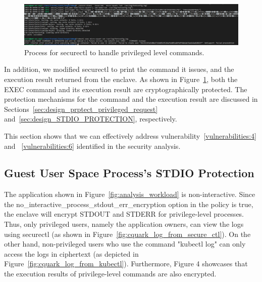 \begin{figure}[!htb]
    \centering
    \includegraphics[width=1\textwidth]{images/cquark_priviled_cmd_result_protection.PNG}
    \caption[Process for securectl to handle privileged level commands]{Process for securectl to handle privileged level commands.}
    \label{fig:cquark_priviled_cmd_result_protection}
\end{figure}


In addition, we modified securectl to print the command it issues, and the execution result returned from the enclave. As shown in Figure~\ref{fig:cquark_priviled_cmd_result_protection}, both the EXEC command and its execution result are cryptographically protected. The protection mechanisms for the command and the execution result are 
discussed in Sections~\ref{sec:design_prptect_privileged_request} and~\ref{sec:design_STDIO_PROTECTION}, respectively.


This section shows that we can effectively address vulnerability~\ref{vulnerabilities:4} and ~\ref{vulnerabilities:6} identified in the security analysis.



\subsection{Guest User Space Process's STDIO Protection}
The application shown in Figure~\ref{fig:analysis_workload} is non-interactive. Since the no\_interactive\_process\_stdout\_err\_encryption option in the policy is true, the enclave will encrypt STDOUT and STDERR for privilege-level processes. Thus, only privileged users, namely the application owners, can view the logs using securectl (as shown in Figure~\ref{fig:cquark_log_from_secure_ctl}). On the other hand, non-privileged users who use the command 
"kubectl log" can only access the logs in ciphertext (as depicted in Figure~\ref{fig:cquark_log_from_kubectl}). Furthermore, Figure 4 showcases that the execution results of privilege-level commands are also encrypted.

